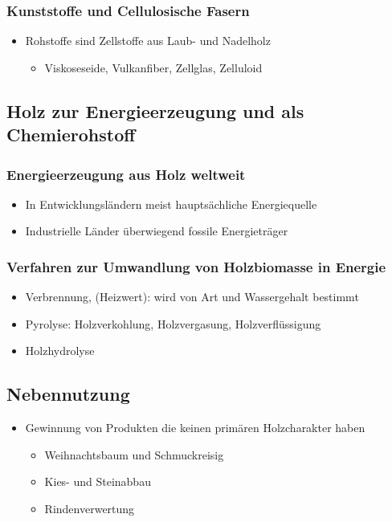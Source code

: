 \documentclass{article}
\begin{document}
\subsubsection{Kunststoffe und Cellulosische Fasern}
\begin{itemize}
  \item Rohstoffe sind Zellstoffe aus Laub- und Nadelholz
  \begin{itemize}
    \item Viskoseseide, Vulkanfiber, Zellglas, Zelluloid
  \end{itemize}
\end{itemize}

\subsection{Holz zur Energieerzeugung und als Chemierohstoff}
\subsubsection{Energieerzeugung aus Holz weltweit}
\begin{itemize}
  \item In Entwicklungsländern meist hauptsächliche Energiequelle
  \item Industrielle Länder überwiegend fossile Energieträger
\end{itemize}

\subsubsection{Verfahren zur Umwandlung von Holzbiomasse in Energie}
\begin{itemize}
  \item Verbrennung, (Heizwert): wird von Art und Wassergehalt bestimmt
  \item Pyrolyse: Holzverkohlung, Holzvergasung, Holzverflüssigung
  \item Holzhydrolyse
\end{itemize}
\subsection{Nebennutzung}
\begin{itemize}
  \item Gewinnung von Produkten die keinen primären Holzcharakter haben
  \begin{itemize}
    \item Weihnachtsbaum und Schmuckreisig
    \item Kies- und Steinabbau
    \item Rindenverwertung
  \end{itemize}
\end{itemize}
\end{document}
